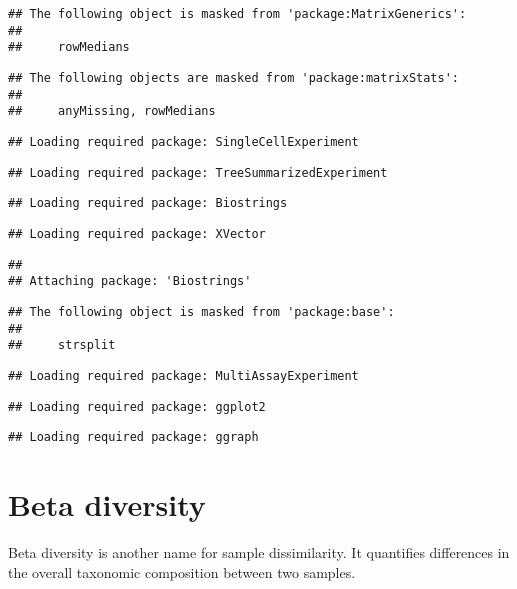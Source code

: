 \documentclass[
  oneside]{book}
\begin{document}
\begin{verbatim}
## The following object is masked from 'package:MatrixGenerics':
## 
##     rowMedians
\end{verbatim}

\begin{verbatim}
## The following objects are masked from 'package:matrixStats':
## 
##     anyMissing, rowMedians
\end{verbatim}

\begin{verbatim}
## Loading required package: SingleCellExperiment
\end{verbatim}

\begin{verbatim}
## Loading required package: TreeSummarizedExperiment
\end{verbatim}

\begin{verbatim}
## Loading required package: Biostrings
\end{verbatim}

\begin{verbatim}
## Loading required package: XVector
\end{verbatim}

\begin{verbatim}
## 
## Attaching package: 'Biostrings'
\end{verbatim}

\begin{verbatim}
## The following object is masked from 'package:base':
## 
##     strsplit
\end{verbatim}

\begin{verbatim}
## Loading required package: MultiAssayExperiment
\end{verbatim}

\begin{verbatim}
## Loading required package: ggplot2
\end{verbatim}

\begin{verbatim}
## Loading required package: ggraph
\end{verbatim}

\hypertarget{beta-diversity}{%
\chapter{Beta diversity}\label{beta-diversity}}

Beta diversity is another name for sample dissimilarity. It quantifies
differences in the overall taxonomic composition between two samples.
\end{document}
